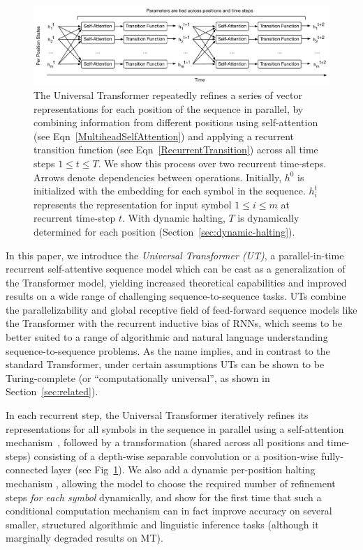 \begin{figure}
 \centering
 \includegraphics[width=\textwidth]{04-part-03/chapter-06/figs_and_tables/fig_universal-transformer-as-rnn.pdf}
 \caption{The Universal Transformer repeatedly refines a series of vector representations for each position of the sequence in parallel, by combining information from different positions using self-attention (see Eqn~\ref{MultiheadSelfAttention}) and applying a recurrent transition function (see Eqn~\ref{RecurrentTransition}) across all time steps $1 \leq t \leq T$. We show this process over two recurrent time-steps. Arrows denote dependencies between operations. Initially, $h^0$ is initialized with the embedding for each symbol in the sequence. $h^t_i$ represents the representation for input symbol $1 \leq i \leq m$ at recurrent time-step $t$. With dynamic halting, $T$ is dynamically determined for each position (Section~\ref{sec:dynamic-halting}).}
 \label{fig:rec-state}
\end{figure}

In this paper, we introduce the \emph{Universal Transformer (UT)}, a parallel-in-time recurrent self-attentive sequence model which can be cast as a generalization of the Transformer model, yielding increased theoretical capabilities and improved results on a wide range of challenging sequence-to-sequence tasks. UTs combine the parallelizability and global receptive field of feed-forward sequence models like the Transformer with the recurrent inductive bias of RNNs, which seems to be better suited to a range of algorithmic and natural language understanding sequence-to-sequence problems. As the name implies, and in contrast to the standard Transformer, under certain assumptions UTs can be shown to be Turing-complete (or ``computationally universal'', as shown in Section~\ref{sec:related}).

In each recurrent step, the Universal Transformer iteratively refines its representations for all symbols in the sequence in parallel using a self-attention mechanism~\citep{decomposableAttnModel,lin2017structured}, followed by a transformation (shared across all positions and time-steps) consisting of a depth-wise separable convolution \citep{xception2016,slicenet} or a position-wise fully-connected layer (see Fig~\ref{fig:rec-state}). We also add a dynamic per-position halting mechanism \citep{graves2016adaptive}, allowing the model to choose the required number of refinement steps \emph{for each symbol} dynamically, and show for the first time that such a conditional computation mechanism can in fact improve accuracy on several smaller, structured algorithmic and linguistic inference tasks (although it marginally degraded results on MT). 

